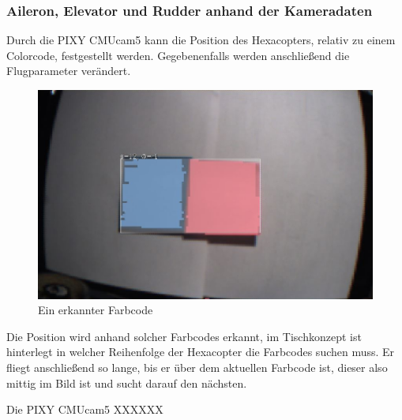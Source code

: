     \subsubsection{Aileron, Elevator und Rudder anhand der Kameradaten}
    Durch die PIXY CMUcam5 kann die Position des Hexacopters, relativ zu einem Colorcode, festgestellt werden. Gegebenenfalls werden anschließend die Flugparameter verändert.

    \begin{figure} [tbh]
      \begin{centering}
        \includegraphics[width = \textwidth]{Bilder/Farbcode_erkannt}
      \par\end{centering}
      \caption{Ein erkannter Farbcode}
      \label{Farbcode_erkannt}
    \end{figure}
    Die Position wird anhand solcher Farbcodes erkannt, im Tischkonzept ist hinterlegt in welcher Reihenfolge der Hexacopter die Farbcodes suchen muss.
    Er fliegt anschließend so lange, bis er über dem aktuellen Farbcode ist, dieser also mittig im Bild ist und sucht darauf den nächsten.


    Die PIXY CMUcam5 XXXXXX %



